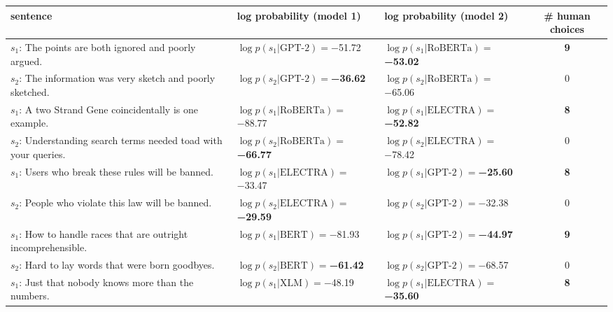 \begin{tabularx}{\textwidth}{lllc}
\toprule
                                                               sentence &                               log probability (model 1) &                               log probability (model 2) &   \# human choices \\
\midrule
                  $s_1$: The points are both ignored and poorly argued. &             $\log p(s_1 | \textrm{GPT-2})=$\num{-51.72} &  $\log p(s_1 | \textrm{RoBERTa})=$\textbf{\num{-53.02}} &   \textbf{\num{9}} \\
            $s_2$: The information was very sketch and poorly sketched. &    $\log p(s_2 | \textrm{GPT-2})=$\textbf{\num{-36.62}} &           $\log p(s_2 | \textrm{RoBERTa})=$\num{-65.06} &            \num{0} \\\midrule
                $s_1$: A two Strand Gene coincidentally is one example. &           $\log p(s_1 | \textrm{RoBERTa})=$\num{-88.77} &  $\log p(s_1 | \textrm{ELECTRA})=$\textbf{\num{-52.82}} &   \textbf{\num{8}} \\
       $s_2$: Understanding search terms needed toad with your queries. &  $\log p(s_2 | \textrm{RoBERTa})=$\textbf{\num{-66.77}} &           $\log p(s_2 | \textrm{ELECTRA})=$\num{-78.42} &            \num{0} \\\midrule
                     $s_1$: Users who break these rules will be banned. &           $\log p(s_1 | \textrm{ELECTRA})=$\num{-33.47} &    $\log p(s_1 | \textrm{GPT-2})=$\textbf{\num{-25.60}} &   \textbf{\num{8}} \\
                     $s_2$: People who violate this law will be banned. &  $\log p(s_2 | \textrm{ELECTRA})=$\textbf{\num{-29.59}} &             $\log p(s_2 | \textrm{GPT-2})=$\num{-32.38} &            \num{0} \\\midrule
         $s_1$: How to handle races that are outright incomprehensible. &              $\log p(s_1 | \textrm{BERT})=$\num{-81.93} &    $\log p(s_1 | \textrm{GPT-2})=$\textbf{\num{-44.97}} &   \textbf{\num{9}} \\
                      $s_2$: Hard to lay words that were born goodbyes. &     $\log p(s_2 | \textrm{BERT})=$\textbf{\num{-61.42}} &             $\log p(s_2 | \textrm{GPT-2})=$\num{-68.57} &            \num{0} \\\midrule
                   $s_1$: Just that nobody knows more than the numbers. &               $\log p(s_1 | \textrm{XLM})=$\num{-48.19} &  $\log p(s_1 | \textrm{ELECTRA})=$\textbf{\num{-35.60}} &   \textbf{\num{8}} \\

\end{tabularx}
